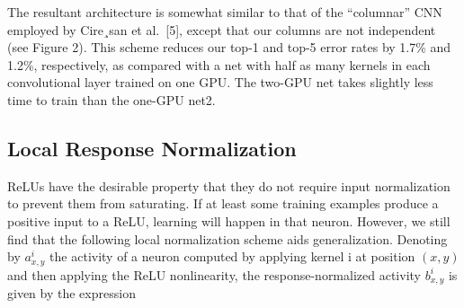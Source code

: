 \documentclass[12pt,a4paper,UTF8,twoside]{book}
\begin{document}
The resultant architecture is somewhat similar to that of the ``columnar'' CNN employed by Cire¸san et al.~{[}5{]}, except that our columns are not independent (see Figure 2). This scheme reduces our top-1 and top-5 error rates by 1.7\% and 1.2\%, respectively, as compared with a net with half as many kernels in each convolutional layer trained on one GPU. The two-GPU net takes slightly less time to train than the one-GPU net2.

\hypertarget{local-response-normalization}{%
\subsection{Local Response Normalization}\label{local-response-normalization}}

ReLUs have the desirable property that they do not require input normalization to prevent them from saturating. If at least some training examples produce a positive input to a ReLU, learning will happen in that neuron. However, we still find that the following local normalization scheme aids generalization. Denoting by \(a^i_{x,y}\) the activity of a neuron computed by applying kernel i at position \((x, y)\) and then applying the ReLU nonlinearity, the response-normalized activity \(b^i_{x,y}\) is given by the expression


\backmatter
\end{document}
